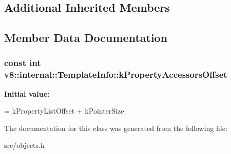 \subsection*{Additional Inherited Members}


\subsection{Member Data Documentation}
\hypertarget{classv8_1_1internal_1_1_template_info_adb44b9970edc23fa6c622248af66db6f}{}
\subsubsection[{k\+Property\+Accessors\+Offset}]{\setlength{\rightskip}{0pt plus 5cm}const int v8\+::internal\+::\+Template\+Info\+::k\+Property\+Accessors\+Offset\hspace{0.3cm}{\ttfamily [static]}}\label{classv8_1_1internal_1_1_template_info_adb44b9970edc23fa6c622248af66db6f}
{\bfseries Initial value\+:}
\begin{DoxyCode}
=
      kPropertyListOffset + kPointerSize
\end{DoxyCode}


The documentation for this class was generated from the following file\+:\begin{DoxyCompactItemize}
\item 
src/objects.\+h\end{DoxyCompactItemize}
